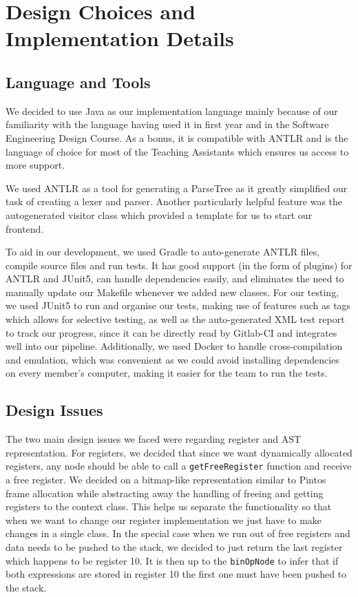 \documentclass[11pt,a4paper]{article}
\newcommand{\cmd}[1]{\texttt{#1}}
\begin{document}
\section{Design Choices and Implementation Details}
\subsection{Language and Tools}
We decided to use Java as our implementation language mainly because of our familiarity with the language having used it in first year and in the Software Engineering Design Course. As a bonus, it is compatible with ANTLR and is the language of choice for most of the Teaching Assistants which ensures us access to more support. 

We used ANTLR as a tool for generating a ParseTree as it greatly simplified our task of creating a lexer and parser. Another particularly helpful feature was the autogenerated visitor class which provided a template for us to start our frontend.

To aid in our development, we used Gradle to auto-generate ANTLR files, compile source files and run tests. It has good support (in the form of plugins) for ANTLR and JUnit5, can handle dependencies easily, and eliminates the need to manually update our Makefile whenever we added new classes. For our testing, we used JUnit5 to run and organise our tests, making use of features such as tags which allows for selective testing, as well as the auto-generated XML test report to track our progress, since it can be directly read by Gitlab-CI and integrates well into our pipeline. Additionally, we used Docker to handle cross-compilation and emulation, which was convenient as we could avoid installing dependencies on every member’s computer, making it easier for the team to run the tests.

\subsection{Design Issues}
The two main design issues we faced were regarding register and AST  representation. For registers, we decided that since we want dynamically allocated registers, any node should be able to call a \cmd{getFreeRegister} function and receive a free register. We decided on a bitmap-like representation similar to Pintos frame allocation while abstracting away the handling of freeing and getting registers to the context class. This helps us separate the functionality so that when we want to change our register implementation we just have to make changes in a single class.  In the special case when we run out of free registers and data needs to be pushed to the stack, we decided to just return the last register which happens to be register 10. It is then up to the \cmd{binOpNode} to infer that if both expressions are stored in register 10 the first one must have been pushed to the stack. 
\end{document}

